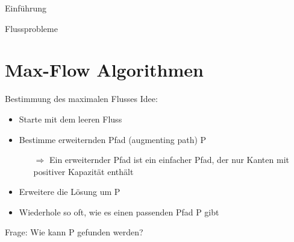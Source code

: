 \documentclass[18pt]{beamer}
\begin{document}
\begin{frame}{Einf\"uhrung}
\begin{figure}
\begin{tikzpicture}[node distance=2cm, auto, thick]
		\end{tikzpicture}		
	\end{figure}
	
	\centering
\end{frame}

\begin{frame}{Flussprobleme}
	\begin{itemize}
	\end{itemize}
\end{frame}

\section{Max-Flow Algorithmen}
\begin{frame}{Bestimmung des maximalen Flusses}
Idee:
\begin{itemize}
	\item Starte mit dem leeren Fluss
	\item Bestimme erweiternden Pfad (augmenting path) P
	\begin{itemize}
		\item[$\Rightarrow$] Ein erweiternder Pfad ist ein einfacher Pfad, der nur Kanten mit positiver Kapazit\"at enth\"alt
	\end{itemize}
	\item Erweitere die L\"osung um P
	\item Wiederhole so oft, wie es einen passenden Pfad P gibt 
\end{itemize} 
\vspace{5mm}
\pause 
Frage: Wie kann P gefunden werden?
\end{frame}
\end{document}

